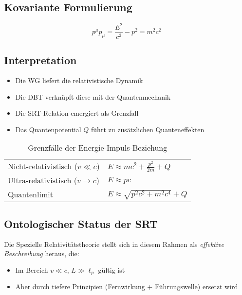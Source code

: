 \subsection{Kovariante Formulierung}
\begin{equation}
p^\mu p_\mu = \frac{E^2}{c^2} - p^2 = m^2c^2
\end{equation}

\subsection{Interpretation}
\begin{itemize}
\item Die WG liefert die relativistische Dynamik
\item Die DBT verknüpft diese mit der Quantenmechanik
\item Die SRT-Relation emergiert als Grenzfall
\item Das Quantenpotential $Q$ führt zu zusätzlichen Quanteneffekten
\end{itemize}

\begin{table}[h]
\centering
\caption{Grenzfälle der Energie-Impuls-Beziehung}
\begin{tabular}{ll}
\hline
Nicht-relativistisch ($v \ll c$) & $E \approx mc^2 + \frac{p^2}{2m} + Q$ \\
Ultra-relativistisch ($v \to c$) & $E \approx pc$ \\
Quantenlimit & $E \approx \sqrt{p^2c^2 + m^2c^4} + Q$ \\
\hline
\end{tabular}
\end{table}

\subsection*{Ontologischer Status der SRT}
Die Spezielle Relativitätstheorie stellt sich in diesem Rahmen als \textit{effektive Beschreibung} heraus, die:
\begin{itemize}
\item Im Bereich \( v \ll c \), \( L \gg \ell_p \) gültig ist
\item Aber durch tiefere Prinzipien (Fernwirkung + Führungswelle) ersetzt wird
\end{itemize}
